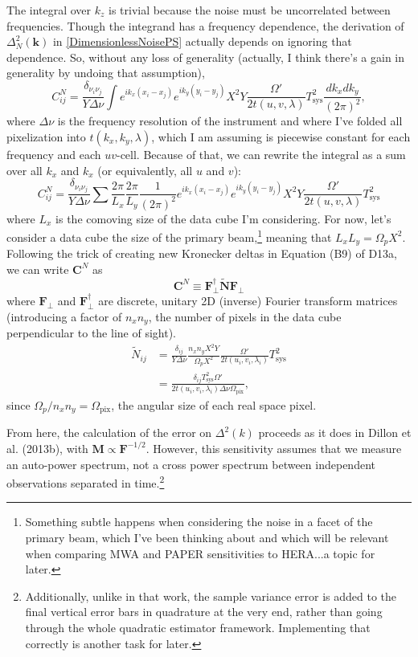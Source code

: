 \documentclass[]{article}
\newcommand{\beq}{\begin{equation}}
\newcommand{\eeq}{\end{equation}}
\newcommand{\Tsys}{T_\text{sys}}
\newcommand{\kv}{\mathbf{k}}
\begin{document}
The integral over $k_z$ is trivial because the noise must be uncorrelated between frequencies.  Though the integrand has a frequency dependence, the  derivation of $\Delta_N^2(\kv)$ in \eqref{DimensionlessNoisePS} actually depends on ignoring that dependence.  So, without any loss of generality (actually, I think there's a gain in generality by undoing that assumption),
\beq
C^N_{ij} = \frac{\delta_{\nu_i \nu_j}}{Y\Delta \nu} \int e^{i k_x (x_i - x_j)} e^{i k_y(y_i-y_j)} X^2 Y \frac{\Omega'}{2t(u,v,\lambda)}\Tsys^2 \frac{dk_x dk_y}{(2\pi)^2},
\eeq
where $\Delta \nu$ is the frequency resolution of the instrument and where I've folded all pixelization into $t(k_x,k_y,\lambda)$, which I am assuming is piecewise constant for each frequency and each $uv$-cell.  Because of that, we can rewrite the integral as a sum over all $k_x$ and $k_x$ (or equivalently, all $u$ and $v$):
\beq
C^N_{ij} = \frac{\delta_{\nu_i \nu_j}}{Y \Delta \nu}\sum \frac{2\pi}{L_x}  \frac{2\pi}{L_y} \frac{1}{(2\pi)^2} e^{i k_x (x_i - x_j)} e^{i k_y(y_i-y_j)} X^2 Y \frac{\Omega'}{2t(u,v,\lambda)}\Tsys^2
\eeq
where $L_x$ is the comoving size of the data cube I'm considering.  For now, let's consider a data cube the size of the primary beam,\footnote{Something subtle happens when considering the noise in a facet of the primary beam, which I've been thinking about and which will be relevant when comparing MWA and PAPER sensitivities to HERA...a topic for later.} meaning that $L_x L_y = \Omega_p X^2$.  Following the trick of creating new Kronecker deltas in Equation (B9) of D13a, 
we can write $\mathbf{C}^N$ as 
\beq
\mathbf{C}^N \equiv \mathbf{F}^\dagger_\perp \widetilde{\mathbf{N}} \mathbf{F}_\perp
\eeq
where $\mathbf{F}_\perp$ and $\mathbf{F}^\dagger_\perp$ are discrete, unitary 2D (inverse) Fourier transform matrices (introducing a factor of $n_x n_y$, the number of pixels in the data cube perpendicular to the line of sight).
\begin{align}
\widetilde{N}_{ij} &= \frac{\delta_{ij}}{Y\Delta \nu} \frac{n_x n_y X^2 Y}{\Omega_p X^2} \frac{\Omega'}{2t(u_i,v_i,\lambda_i)}\Tsys^2 \\
&=\frac{\delta_{ij}\Tsys^2\Omega'}{2 t(u_i,v_i,\lambda_i) \Delta \nu \Omega_\text{pix}} , \label{Nfourier}
\end{align}
since $\Omega_p / n_x n_y = \Omega_\text{pix}$, the angular size of each real space pixel.

From here, the calculation of the error on $\Delta^2(k)$ proceeds as it does in Dillon et al. (2013b), with $\mathbf{M} \propto \mathbf{F}^{-1/2}$.  However, this sensitivity assumes that we measure an auto-power spectrum, not a cross power spectrum between independent observations separated in time.\footnote{Additionally, unlike in that work, the sample variance error is added to the final vertical error bars in quadrature at the very end, rather than going through the whole quadratic estimator framework.  Implementing that correctly is another task for later.}
\end{document}
